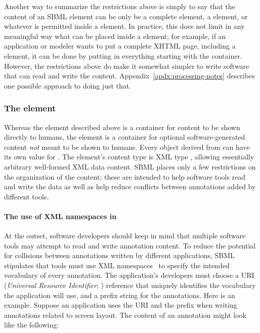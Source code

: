 Another way to summarize the restrictions above is simply to say
that the content of an SBML  element can be only be a
complete  element, a  element, or whatever
is permitted inside a  element.  In practice, this
does not limit in any meaningful way what can be placed inside a
 element; for example, if an application or modeler
wants to put a complete XHTML page, including a 
element, it can be done by putting in everything starting with the
 container.  However, the restrictions above do make
it somewhat simpler to write software that can read and write the
 content.  Appendix~\ref{apdx:processing-notes}
describes one possible approach to doing just that.


\subsubsection{The  element}
\label{sec:annotation-use}

Whereas the  element described above is a container for
content to be shown directly to humans, the 
element is a container for optional software-generated content
\emph{not} meant to be shown to humans.  Every object derived
from \SBase can have its own value for .  The
element's content type is XML type , allowing essentially
arbitrary well-formed XML data content.  SBML places only a few restrictions on
the organization of the content; these are intended to help
software tools read and write the data as well as help reduce
conflicts between annotations added by different tools.


\paragraph{The use of XML namespaces in }


At the outset, software developers should keep in mind that
multiple software tools may attempt to read and write annotation
content.  To reduce the potential for collisions between
annotations written by different applications, SBML \thisLV
stipulates that tools must use XML namespaces~\citep{bray:1999} to
specify the intended vocabulary of every annotation.  The
application's developers must choose a URI (\emph{Universal
  Resource Identifier}; \citealt{harold:2001,w3c:2000}) reference
that uniquely identifies the vocabulary the application will use,
and a prefix string for the annotations.  Here is an example.
Suppose an application uses the URI 
and the prefix  when writing annotations related to
screen layout.  The content of an annotation might look like the
following:

